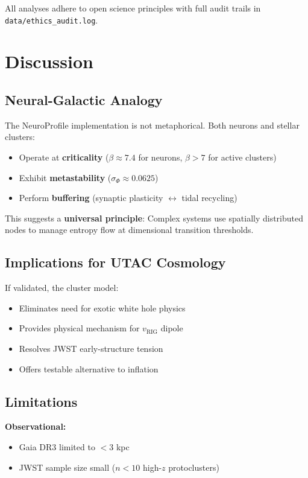 \documentclass[11pt,a4paper,twocolumn]{article}
\begin{document}
All analyses adhere to open science principles with full audit trails in \texttt{data/ethics\_audit.log}.

\section{Discussion}

\subsection{Neural-Galactic Analogy}

The NeuroProfile implementation is not metaphorical. Both neurons and stellar clusters:
\begin{itemize}
    \item Operate at \textbf{criticality} ($\beta \approx 7.4$ for neurons, $\beta > 7$ for active clusters)
    \item Exhibit \textbf{metastability} ($\sigma_\Phi \approx 0.0625$)
    \item Perform \textbf{buffering} (synaptic plasticity $\leftrightarrow$ tidal recycling)
\end{itemize}

This suggests a \textbf{universal principle}: Complex systems use spatially distributed nodes to manage entropy flow at dimensional transition thresholds.

\subsection{Implications for UTAC Cosmology}

If validated, the cluster model:
\begin{itemize}
    \item Eliminates need for exotic white hole physics
    \item Provides physical mechanism for $v_{\text{RIG}}$ dipole
    \item Resolves JWST early-structure tension
    \item Offers testable alternative to inflation
\end{itemize}

\subsection{Limitations}

\textbf{Observational:}
\begin{itemize}
    \item Gaia DR3 limited to $<3$ kpc
    \item JWST sample size small ($n < 10$ high-$z$ protoclusters)
\end{itemize}
\end{document}
